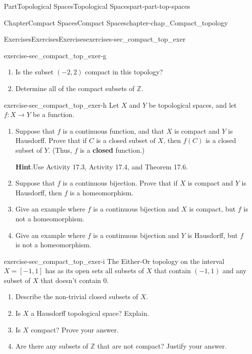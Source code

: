 \documentclass[oneside,10pt,]{book}
\newcommand{\blocktitlefont}{\relax}
\newcommand{\terminology}[1]{\textbf{#1}}
\numberwithin{equation}{chapter}
\newcommand{\Z}{\mathbb{Z}}
\begin{document}
\begin{partptx}{Part}{Topological Spaces}{}{Topological Spaces}{}{}{part-part-top-spaces}
\begin{chapterptx}{Chapter}{Compact Spaces}{}{Compact Spaces}{}{}{chapter-chap_Compact_topology}
\begin{exercises-section}{Exercises}{Exercises}{}{Exercises}{}{}{exercises-sec_compact_top_exer}
\begin{divisionexercise}{6}{}{}{exercise-sec_compact_top_exer-g}
\begin{enumerate}[font=\bfseries,label=(\alph*),ref=\alph*]
\item{}Is the subset \((-2,2)\) compact in this topology?%
\item{}Determine all of the compact subsets of \(\Z\).%
\end{enumerate}%
\end{divisionexercise}%
\begin{divisionexercise}{7}{}{}{exercise-sec_compact_top_exer-h}%
Let \(X\) and \(Y\) be topological spaces, and let \(f: X \to Y\) be a function.%
\begin{enumerate}[font=\bfseries,label=(\alph*),ref=\alph*]%
\item{}Suppose that \(f\) is a continuous function, and that \(X\) is compact and \(Y\) is Hausdorff. Prove that if \(C\) is a closed subset of \(X\), then \(f(C)\) is a closed subset of \(Y\). (Thus, \(f\) is a \terminology{closed} function.)%
\par\smallskip%
\noindent\textbf{\blocktitlefont Hint}.\hypertarget{hint-sec_compact_top_exer-h-b-b}{}\quad{}Use Activity 17.3, Activity 17.4, and Theorem 17.6.%
\item{}Suppose that \(f\) is a continuous bijection. Prove that if \(X\) is compact and \(Y\) is Hausdorff, then \(f\) is a homeomorphism.%
\item{}Give an example where \(f\) is a continuous bijection and \(X\) is compact, but \(f\) is not a homeomorphism.%
\item{}Give an example where \(f\) is a continuous bijection and \(Y\) is Hausdorff, but \(f\) is not a homeomorphism.%
\end{enumerate}%
\end{divisionexercise}%
\begin{divisionexercise}{8}{}{}{exercise-sec_compact_top_exer-i}%
The Either-Or topology on the interval \(X = [-1,1]\) has as its open sets all subsets of \(X\) that contain \((-1,1)\) and any subset of \(X\) that doesn't contain \(0\).%
\begin{enumerate}[font=\bfseries,label=(\alph*),ref=\alph*]%
\item{}Describe the non-trivial closed subsets of \(X\).%
\item{}Is \(X\) a Hausdorff topological space? Explain.%
\item{}Is \(X\) compact? Prove your answer.%
\item{}Are there any subsets of \(\Z\) that are not compact? Justify your answer.%
\end{enumerate}%
\end{divisionexercise}%

\end{exercises-section}
\end{chapterptx}
\end{partptx}
\end{document}
